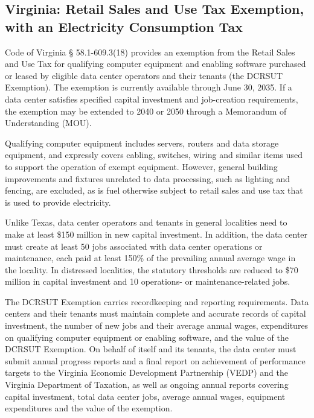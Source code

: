\subsection{Virginia: Retail Sales and Use Tax Exemption, with an Electricity Consumption Tax}

Code of Virginia \S{} 58.1-609.3(18) provides an exemption from the Retail Sales and Use Tax for qualifying computer equipment and enabling software purchased or leased by eligible data center operators and their tenants (the DCRSUT Exemption). The exemption is currently available through June 30, 2035. If a data center satisfies specified capital investment and job-creation requirements, the exemption may be extended to 2040 or 2050 through a Memorandum of Understanding (MOU).

Qualifying computer equipment includes servers, routers and data storage equipment, and expressly covers cabling, switches, wiring and similar items used to support the operation of exempt equipment. However, general building improvements and fixtures unrelated to data processing, such as lighting and fencing, are excluded, as is fuel otherwise subject to retail sales and use tax that is used to provide electricity.

Unlike Texas, data center operators and tenants in general localities need to make at least \$150 million in new capital investment. In addition, the data center must create at least 50 jobs associated with data center operations or maintenance, each paid at least 150\% of the prevailing annual average wage in the locality. In distressed localities, the statutory thresholds are reduced to \$70 million in capital investment and 10 operations- or maintenance-related jobs.


The DCRSUT Exemption carries recordkeeping and reporting requirements. Data centers and their tenants must maintain complete and accurate records of capital investment, the number of new jobs and their average annual wages, expenditures on qualifying computer equipment or enabling software, and the value of the DCRSUT Exemption. On behalf of itself and its tenants, the data center must submit annual progress reports and a final report on achievement of performance targets to the Virginia Economic Development Partnership (VEDP) and the Virginia Department of Taxation, as well as ongoing annual reports covering capital investment, total data center jobs, average annual wages, equipment expenditures and the value of the exemption.

